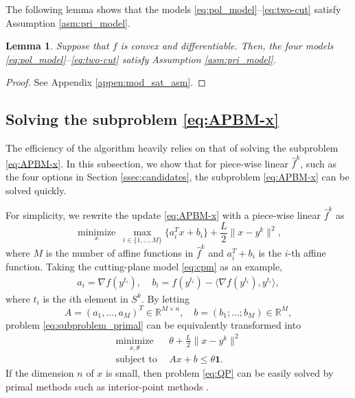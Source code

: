 \documentclass[letterpaper, 10 pt, conference]{ieeeconf}  %
\newtheorem{lemma}{Lemma}  %
\newcommand{\R}{{\mathbb{R}}}
\begin{document}
    The following lemma shows that the models \eqref{eq:pol_model}--\eqref{eq:two-cut} satisfy Assumption \ref{asm:pri_model}.
    
    
    \begin{lemma}\label{lemma:mod_sat_asm}
        Suppose that $f$ is convex and differentiable. Then, the four models \eqref{eq:pol_model}--\eqref{eq:two-cut} satisfy Assumption \ref{asm:pri_model}.
    \end{lemma}
    \begin{proof}
        See Appendix \ref{appen:mod_sat_asm}.
    \end{proof}

 

\subsection{Solving the subproblem \eqref{eq:APBM-x}}
The efficiency of the algorithm heavily relies on that of
solving the subproblem \eqref{eq:APBM-x}. In this subsection, we show that for piece-wise linear $\hat{f}^k$, such as the four options in Section \ref{ssec:candidates}, the subproblem \eqref{eq:APBM-x} can be solved quickly.

For simplicity, we rewrite the update \eqref{eq:APBM-x} with a piece-wise linear $\hat{f}^k$ as
\begin{equation}\label{eq:subproblem_primal}
    \underset{x}{\operatorname{minimize}} ~\max_{i\in\{1,\dots,M\}} \{a_i^Tx+b_i\} + \frac{L}{2}\|x-y^k\|^2,
\end{equation}
where $M$ is the number of affine functions in $\hat{f}^k$ and $a_i^T + b_i$ is the $i$-th affine function. Taking the cutting-plane model \eqref{eq:cpm} as an example,
\begin{align*}
     a_i = \nabla f(y^{t_i}),~~~~~ b_i = f(y^{t_i}) -\langle \nabla f(y^{t_i}),y^{t_i} \rangle,
\end{align*}
where $t_i$ is the $i$th element in $S^k$. By letting
\begin{equation}\label{eq:tilde_A}
    A=(a_1, \ldots, a_M)^T\in\R^{M\times n},\quad  b = (b_1;\ldots;b_M)\in\R^M,
\end{equation}
problem \eqref{eq:subproblem_primal} can be equivalently transformed into
\begin{equation}\label{eq:QP}
    \begin{split}
        \underset{x,\theta}{\operatorname{minimize}}~~&~\theta+\frac{L}{2}\|x-y^k\|^2\\
        \operatorname{subject~to}~ &~Ax+b \le \theta\mathbf{1}.
    \end{split}
\end{equation}
If the dimension $n$ of $x$ is small, then problem \eqref{eq:QP} can be easily solved by primal methods such as interior-point methods \cite{goulart2024clarabel}. 
\end{document}
